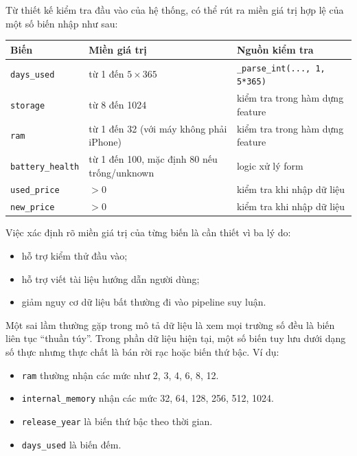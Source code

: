 
Từ thiết kế kiểm tra đầu vào của hệ thống, có thể rút ra miền giá trị hợp lệ của một số biến nhập như sau:

{\small
\begin{center}
\begin{tabularx}{\textwidth}{|>{\raggedright\arraybackslash}p{3.5cm}|>{\raggedright\arraybackslash}p{4.2cm}|X|}
\hline
\textbf{Biến} & \textbf{Miền giá trị} & \textbf{Nguồn kiểm tra} \\
\hline
\texttt{days\_used} & từ 1 đến $5\times365$ & \texttt{\_parse\_int(..., 1, 5*365)} \\
\hline
\texttt{storage} & từ 8 đến 1024 & kiểm tra trong hàm dựng feature \\
\hline
\texttt{ram} & từ 1 đến 32 (với máy không phải iPhone) & kiểm tra trong hàm dựng feature \\
\hline
\texttt{battery\_health} & từ 1 đến 100, mặc định 80 nếu trống/unknown & logic xử lý form \\
\hline
\texttt{used\_price} & $>0$ & kiểm tra khi nhập dữ liệu \\
\hline
\texttt{new\_price} & $>0$ & kiểm tra khi nhập dữ liệu \\
\hline
\end{tabularx}
\end{center}
}


Việc xác định rõ miền giá trị của từng biến là cần thiết vì ba lý do:
\begin{itemize}
    \item hỗ trợ kiểm thử đầu vào;
    \item hỗ trợ viết tài liệu hướng dẫn người dùng;
    \item giảm nguy cơ dữ liệu bất thường đi vào pipeline suy luận.
\end{itemize}


Một sai lầm thường gặp trong mô tả dữ liệu là xem mọi trường số đều là biến liên tục ``thuần túy''. Trong phần dữ liệu hiện tại, một số biến tuy lưu dưới dạng số thực nhưng thực chất là bán rời rạc hoặc biến thứ bậc. Ví dụ:

\begin{itemize}
    \item \texttt{ram} thường nhận các mức như 2, 3, 4, 6, 8, 12.
    \item \texttt{internal\_memory} nhận các mức 32, 64, 128, 256, 512, 1024.
    \item \texttt{release\_year} là biến thứ bậc theo thời gian.
    \item \texttt{days\_used} là biến đếm.
\end{itemize}

